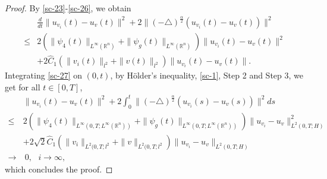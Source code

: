 \documentclass[10pt,a4paper]{amsart}
\def\leq{\leqslant}
\begin{document}
\begin{proof}
    By \eqref{sc-23}-\eqref{sc-26},
    we obtain
    \begin{align}\label{sc-27}
        & \frac{d}{dt} \| u_{v_i}(t) - u_v(t) \|^2
        + 2 \| (-\triangle)^{\frac{\alpha}{2}} \left( u_{v_i}(t) - u_v(t) \right) \|^2
        \nonumber \\
        \leq & 2
        \left( \| \psi_4(t) \|_{L^\infty(\mathbb{R}^n)}
        + \| \psi_g(t) \|_{L^\infty(\mathbb{R}^n)}
        \right)
        \| u_{v_i}(t) - u_v(t) \|^2
        \nonumber \\
        & + 2 \hat{C}_1
        \left(
        \| v_i(t) \|_{l^2}
        + \| v(t) \|_{l^2}
        \right)
        \| u_{v_i}(t) - u_v(t) \|.
    \end{align}
    Integrating \eqref{sc-27}
    on $(0,t)$,
    by H\"{o}lder's inequality, \eqref{sc-1}, Step 2 and Step 3,
    we  get for all $t\in [0, T]$,
    \begin{align} \label{sc-28}
        & \| u_{v_i}(t) - u_v(t) \|^2
        + 2 \int_0^t
        \| (-\triangle)^{\frac{\alpha}{2}} \left( u_{v_i}(s) - u_v(s) \right) \|^2 ds
        \nonumber \\
        \leq & 2
        \left(   \| \psi_4(t) \|_{L^\infty(0,T; L^\infty(\mathbb{R}^n))}
        + \| \psi_g(t) \|_{L^\infty(0,T; L^\infty(\mathbb{R}^n))}
        \right)
        \| u_{v_i} - u_v \|_{L^2(0,T; H)}^2
        \nonumber \\
        & + 2 \sqrt{2} \hat{C}_1
        \left(
        \| v_i \|_{L^2(0,T; l^2}
        + \| v \|_{L^2(0,T; l^2}
        \right)
        \| u_{v_i} - u_v \|_{L^2(0,T; H)}  \nonumber \\
        \rightarrow & \ 0, \ \ \  i \to  \infty,
    \end{align}
    which concludes the proof.
 \end{proof}
\end{document}
